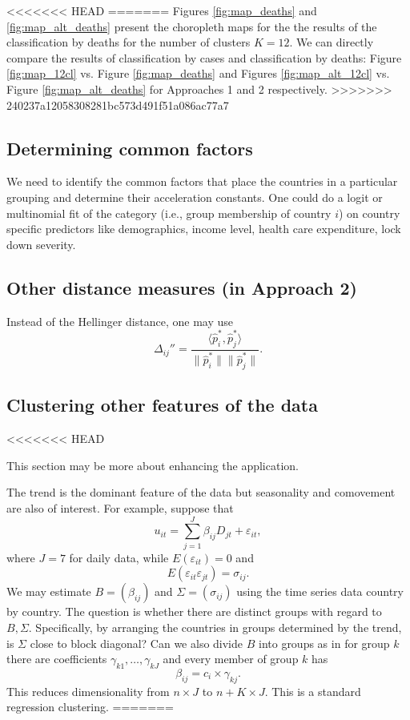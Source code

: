 \documentclass[a4paper,12pt]{article}
\numberwithin{equation}{section}
\begin{document}
<<<<<<< HEAD
=======
{\color{red} Figures \ref{fig:map_deaths} and \ref{fig:map_alt_deaths} present the choropleth maps for the the results of the classification by deaths for the number of clusters $K = 12$. We can directly compare the results of classification by cases and classification by deaths: Figure \ref{fig:map_12cl} vs. Figure \ref{fig:map_deaths} and Figures \ref{fig:map_alt_12cl} vs. Figure \ref{fig:map_alt_deaths} for Approaches 1 and 2 respectively.}
>>>>>>> 240237a12058308281bc573d491f51a086ac77a7

\subsection{Determining common factors}

We need to identify the common factors that place the countries in a particular grouping and determine their acceleration constants. One could do a logit or multinomial fit of the category (i.e., group membership of country $i$) on country specific predictors like demographics, income level, health care expenditure, lock down severity.


\subsection{Other distance measures (in Approach 2)}

Instead of the Hellinger distance, one may use 
\[ \Delta_{ij}'' = \frac{\langle \hat{p}_i^*, \hat{p}_j^* \rangle}{\| \hat{p}_i^* \|  \| \hat{p}_j^* \|}. \] 


\subsection{Clustering other features of the data}
<<<<<<< HEAD

This section may be more about enhancing the application. 

The trend is the dominant feature of the data but seasonality and comovement
are also of interest. For example, suppose that 
\[
u_{it}=\sum_{j=1}^{J}\beta _{ij}D_{jt}+\varepsilon _{it},
\]%
where $J=7$ for daily data, while $E(\varepsilon _{it})=0$ and 
\[
E(\varepsilon _{it}\varepsilon _{jt})=\sigma _{ij}.
\]%
We may estimate $B=(\beta _{ij})$ and $\Sigma =(\sigma _{ij})$ using the
time series data country by country. The question is whether there are
distinct groups with regard to $B,\Sigma .$ Specifically, by arranging the
countries in groups determined by the trend, is $\Sigma $ close to block
diagonal? Can we also divide $B$ into groups as in for group $k$ there are
coefficients $\gamma _{k1},\ldots ,\gamma _{kJ}$ and every member of group $k$ has 
\[
\beta _{ij}=c_{i}\times \gamma _{kj}.
\]%
This reduces dimensionality from $n\times J$ to $n+K\times J.$ This is a
standard regression clustering.
=======
\end{document}
